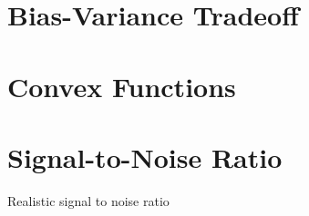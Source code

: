 \begin{appendices}
\section{Bias-Variance Tradeoff}\label{sec:bias-variance}

\section{Convex Functions}

\section{Signal-to-Noise Ratio}

Realistic signal to noise ratio %

\end{appendices}
